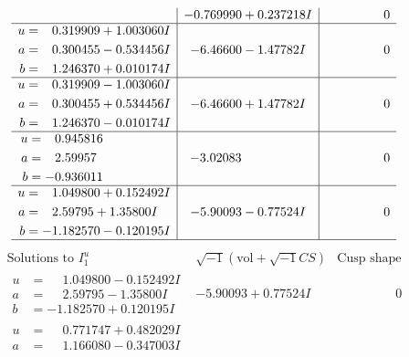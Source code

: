 \documentclass[1p]{elsarticle_modified}
\theoremstyle{definition}
\newcommand{\I}{\sqrt{-1}}
\begin{document}
$$\begin{array}{c|c|c}
 & -0.769990 + 0.237218 I & \phantom{-0.000000 } 0 \\ \hline\begin{aligned}
u &= \phantom{-}0.319909 + 1.003060 I \\
a &= \phantom{-}0.300455 - 0.534456 I \\
b &= \phantom{-}1.246370 + 0.010174 I\end{aligned}
 & -6.46600 - 1.47782 I & \phantom{-0.000000 } 0 \\ \hline\begin{aligned}
u &= \phantom{-}0.319909 - 1.003060 I \\
a &= \phantom{-}0.300455 + 0.534456 I \\
b &= \phantom{-}1.246370 - 0.010174 I\end{aligned}
 & -6.46600 + 1.47782 I & \phantom{-0.000000 } 0 \\ \hline\begin{aligned}
u &= \phantom{-}0.945816\phantom{ +0.000000I} \\
a &= \phantom{-}2.59957\phantom{ +0.000000I} \\
b &= -0.936011\phantom{ +0.000000I}\end{aligned}
 & -3.02083\phantom{ +0.000000I} & \phantom{-0.000000 } 0 \\ \hline\begin{aligned}
u &= \phantom{-}1.049800 + 0.152492 I \\
a &= \phantom{-}2.59795 + 1.35800 I \\
b &= -1.182570 - 0.120195 I\end{aligned}
 & -5.90093 - 0.77524 I & \phantom{-0.000000 } 0\\
 \hline 
 \end{array}$$\newpage$$\begin{array}{c|c|c}  
\text{Solutions to }I^u_{1}& \I (\text{vol} + \sqrt{-1}CS) & \text{Cusp shape}\\
 \hline 
\begin{aligned}
u &= \phantom{-}1.049800 - 0.152492 I \\
a &= \phantom{-}2.59795 - 1.35800 I \\
b &= -1.182570 + 0.120195 I\end{aligned}
 & -5.90093 + 0.77524 I & \phantom{-0.000000 } 0 \\ \hline\begin{aligned}
u &= \phantom{-}0.771747 + 0.482029 I \\
a &= \phantom{-}1.166080 - 0.347003 I \\

\end{aligned}
\end{array}$$
\end{document}
